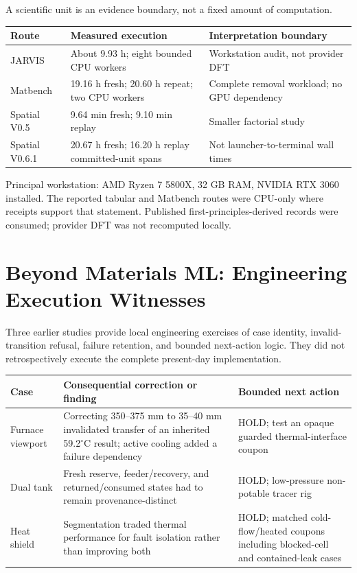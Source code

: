 \documentclass[9pt,a4paper]{article}
\begin{document}
A scientific unit is an evidence boundary, not a fixed amount of computation.

\begin{tabularx}{\textwidth}{p{}YY}
\toprule Route & Measured execution & Interpretation boundary\\\midrule
JARVIS & About 9.93 h; eight bounded CPU workers & Workstation audit, not provider DFT\\
Matbench & 19.16 h fresh; 20.60 h repeat; two CPU workers & Complete removal workload; no GPU dependency\\
Spatial V0.5 & 9.64 min fresh; 9.10 min replay & Smaller factorial study\\
Spatial V0.6.1 & 20.67 h fresh; 16.20 h replay committed-unit spans & Not launcher-to-terminal wall times\\
\bottomrule
\end{tabularx}

Principal workstation: AMD Ryzen 7 5800X, 32 GB RAM, NVIDIA RTX 3060 installed. The reported tabular and Matbench routes were CPU-only where receipts support that statement. Published first-principles-derived records were consumed; provider DFT was not recomputed locally.

\section{Beyond Materials ML: Engineering Execution Witnesses}
Three earlier studies provide local engineering exercises of case identity, invalid-transition refusal, failure retention, and bounded next-action logic. They did not retrospectively execute the complete present-day implementation.

\begin{tabularx}{\textwidth}{p{}YY}
\toprule Case & Consequential correction or finding & Bounded next action\\\midrule
Furnace viewport & Correcting 350--375 mm to 35--40 mm invalidated transfer of an inherited 59.2$^\circ$C result; active cooling added a failure dependency & HOLD; test an opaque guarded thermal-interface coupon\\
Dual tank & Fresh reserve, feeder/recovery, and returned/consumed states had to remain provenance-distinct & HOLD; low-pressure non-potable tracer rig\\
Heat shield & Segmentation traded thermal performance for fault isolation rather than improving both & HOLD; matched cold-flow/heated coupons including blocked-cell and contained-leak cases\\
\bottomrule
\end{tabularx}
\end{document}
